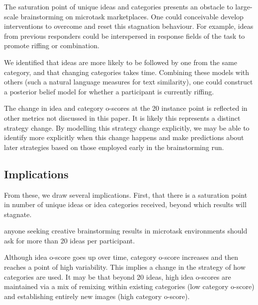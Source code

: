 The saturation point of unique ideas and categories presents an obstacle to large-scale brainstorming on microtask marketplaces. One could conceivable develop interventions to overcome and reset this stagnation behaviour. For example, ideas from previous responders could be interspersed in response fields of the task to promote riffing or combination.

We identified that ideas are more likely to be followed by one from the same category, and that changing categories takes time. Combining these models with others (such a natural language measures for text similarity), one could construct a posterior belief model for whether a participant is currently riffing.

The change in idea and category o-scores at the 20 instance point is reflected in other metrics not discussed in this paper. It is likely this represents a distinct strategy change. By modelling this strategy change explicitly, we may be able to identify more explicitly when this change happens and make predictions about later strategies based on those employed early in the brainstorming run.




\subsection{Implications}

From these, we draw several implications. First, that there is a saturation point in number of unique ideas or idea categories received, beyond which results will stagnate.

anyone seeking creative brainstorming results in microtask environments should ask for more than 20 ideas per participant.

Although idea o-score goes up over time, category o-score increases and then reaches a point of high variability. This implies a change in the strategy of how categories are used. It may be that beyond 20 ideas, high idea o-scores are maintained via a mix of remixing within existing categories (low category o-score) and establishing entirely new images (high category o-score).




